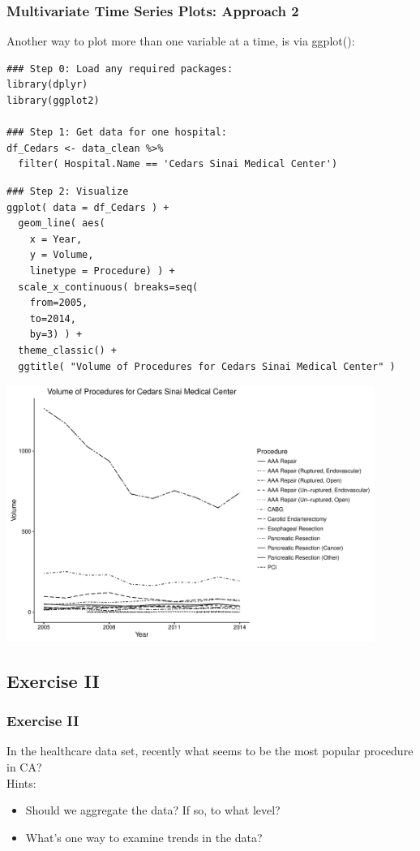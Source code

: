\begin{frame}
 \frametitle{Multivariate Time Series Plots: Approach 2}

Another way to plot more than one variable at a time, is via \ttfamily ggplot()\normalfont :

    \begin{lstlisting}
### Step 0: Load any required packages:
library(dplyr)
library(ggplot2)

### Step 1: Get data for one hospital:
df_Cedars <- data_clean %>%
  filter( Hospital.Name == 'Cedars Sinai Medical Center')
   \end{lstlisting}

\newpage
    \begin{lstlisting}
### Step 2: Visualize
ggplot( data = df_Cedars ) + 
  geom_line( aes(
    x = Year, 
    y = Volume, 
    linetype = Procedure) ) +
  scale_x_continuous( breaks=seq(
    from=2005, 
    to=2014, 
    by=3) ) +
  theme_classic() +
  ggtitle( "Volume of Procedures for Cedars Sinai Medical Center" )
   \end{lstlisting}

\newpage
       \begin{center}
         \includegraphics[width=0.9\textwidth]{images/timeseries_Cedars}
        \end{center}
\end{frame}

\subsection{Exercise II}
\begin{frame}[fragile]
	\frametitle{Exercise II}
	In the healthcare data set, recently what seems to be the most popular procedure in CA?\\
  \vspace{10pt}
  \noindent Hints: \small
    \begin{itemize}
      \item Should we aggregate the data?  If so, to what level?
      \item What's one way to examine trends in the data?
    \end{itemize}

    \normalsize
\end{frame}
